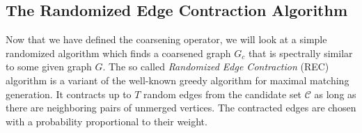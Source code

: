 \subsection{The Randomized Edge Contraction Algorithm}%
\label{sec:coarse:rec}

Now that we have defined the coarsening operator, we will look at a simple randomized algorithm which finds a coarsened graph $G_c$ that is spectrally similar to some given graph $G$.
The so called \textit{Randomized Edge Contraction} (REC) algorithm is a variant of the well-known greedy algorithm for maximal matching generation.
It contracts up to $T$ random edges from the candidate set $\mathcal{C}$ as long as there are neighboring pairs of unmerged vertices.
The contracted edges are chosen with a probability proportional to their weight.
\begin{figure}
	\setlength{\intextsep}{0pt}
	\begin{minipage}{0.6\linewidth}
		\begin{algorithm}[H]
			\caption{Randomized Edge Contraction}\label{algo:coarse:rec}
			\begin{algorithmic}[1]
					\EndWhile{}
				\EndFunction{}
			\end{algorithmic}
		\end{algorithm}
	\end{minipage}%
	\begin{minipage}{0.4\linewidth}
		\begin{figure}[H]
			\centering

\end{figure}
\end{minipage}
\end{figure}
